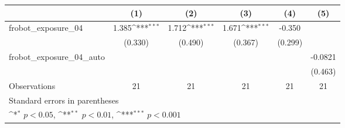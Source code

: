 {
\def\sym#1{\ifmmode^{#1}\else\(^{#1}\)\fi}
\begin{tabular}{l*{5}{c}}
\toprule
                    &\multicolumn{1}{c}{(1)}         &\multicolumn{1}{c}{(2)}         &\multicolumn{1}{c}{(3)}         &\multicolumn{1}{c}{(4)}         &\multicolumn{1}{c}{(5)}         \\
\midrule
frobot\_exposure\_04  &       1.385\sym{***}&       1.712\sym{***}&       1.671\sym{***}&      -0.350         &                     \\
                    &     (0.330)         &     (0.490)         &     (0.367)         &     (0.299)         &                     \\
\addlinespace
frobot\_exposure\_04\_auto&                     &                     &                     &                     &     -0.0821         \\
                    &                     &                     &                     &                     &     (0.463)         \\
\midrule
Observations        &          21         &          21         &          21         &          21         &          21         \\
\bottomrule
\multicolumn{6}{l}{\footnotesize Standard errors in parentheses}\\
\multicolumn{6}{l}{\footnotesize \sym{*} \(p<0.05\), \sym{**} \(p<0.01\), \sym{***} \(p<0.001\)}\\
\end{tabular}
}
